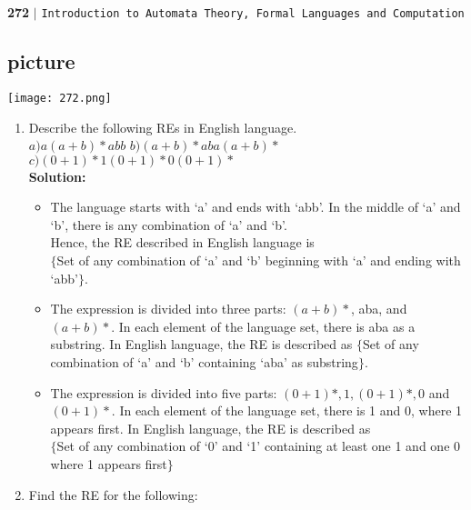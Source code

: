 \documentclass{article}
\begin{document}
\newpage
\begin{flushleft}
    \textbf{272}\hspace*{0.1cm} \textbf{$|$} \hspace*{0.1cm} \texttt{Introduction to Automata Theory, Formal Languages and Computation}
  \end{flushleft}


\begin{center}
\section{picture}
\texttt{[image: 272.png]}
\end{center}


\begin{enumerate}
  \item Describe the following REs in English language.\\
  $a) a(a+b)*abb$   \hspace*{0.4cm}  $b) (a+b)*aba(a+b)*$  \hspace*{0.4cm}  $c) (0+1)*1(0+1)*0(0+1)*$ \\
  \textbf{Solution:}\\
  \begin{itemize}
    \item The language starts with ‘a’ and ends with ‘abb’. In the middle of ‘a’ and ‘b’, there is any
combination of ‘a’ and ‘b’.\\
Hence, the RE described in English language is\\
$\{$Set of any combination of ‘a’ and ‘b’ beginning with ‘a’ and ending with ‘abb’$\}$.\\
    \item The expression is divided into three parts: $(a+b)*$, aba, and $(a+b)*$. In each element of the
language set, there is aba as a substring. In English language, the RE is described as
$\{$Set of any combination of ‘a’ and ‘b’ containing ‘aba’ as substring$\}$.\\
    \item The expression is divided into five parts: $(0+1)*, 1, (0+1)*, 0$ and $(0+1)*$. In each element
of the language set, there is 1 and 0, where 1 appears first. In English language, the RE is
described as\\
$\{$Set of any combination of ‘0’ and ‘1’ containing at least one 1 and one 0 where 1 appears
first$\}$ \\
  \end{itemize}
  \item Find the RE for the following:\\
\end{enumerate}
\end{document}
